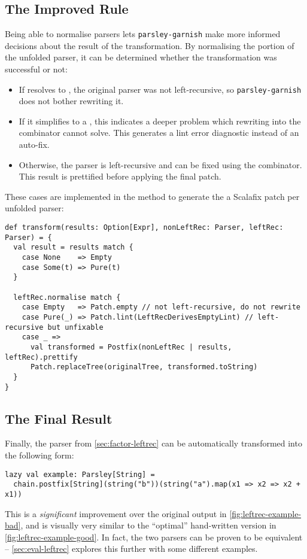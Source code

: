 \documentclass[../../main.tex]{subfiles}
\begin{document}
\subsection{The Improved Rule}
Being able to normalise parsers lets \texttt{parsley-garnish} make more informed decisions about the result of the transformation.
By normalising the  portion of the unfolded parser, it can be determined whether the transformation was successful or not:
\begin{itemize}
  \item If  resolves to , the original parser was not left-recursive, so \texttt{parsley-garnish} does not bother rewriting it.
  \item If it simplifies to a , this indicates a deeper problem which rewriting into the  combinator cannot solve. This generates a lint error diagnostic instead of an auto-fix.
  \item Otherwise, the parser is left-recursive and can be fixed using the  combinator. This result is prettified before applying the final patch.
\end{itemize}
%
These cases are implemented in the  method to generate the a Scalafix patch per unfolded parser:
\begin{verbatim}
def transform(results: Option[Expr], nonLeftRec: Parser, leftRec: Parser) = {
  val result = results match {
    case None    => Empty
    case Some(t) => Pure(t)
  }

  leftRec.normalise match {
    case Empty   => Patch.empty // not left-recursive, do not rewrite
    case Pure(_) => Patch.lint(LeftRecDerivesEmptyLint) // left-recursive but unfixable
    case _ =>
      val transformed = Postfix(nonLeftRec | results, leftRec).prettify
      Patch.replaceTree(originalTree, transformed.toString)
  }
}
\end{verbatim}

\subsection*{The Final Result}
Finally, the  parser from \cref{sec:factor-leftrec} can be automatically transformed into the following form:
\begin{verbatim}
lazy val example: Parsley[String] =
  chain.postfix[String](string("b"))(string("a").map(x1 => x2 => x2 + x1))
\end{verbatim}
%
This is a \emph{significant} improvement over the original output in \cref{fig:leftrec-example-bad}, and is visually very similar to the ``optimal'' hand-written version in \cref{fig:leftrec-example-good}.
In fact, the two parsers can be proven to be equivalent -- \cref{sec:eval-leftrec} explores this further with some different examples.
\end{document}
